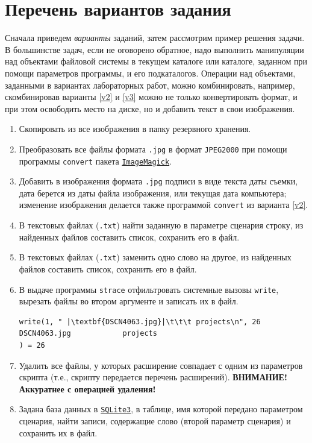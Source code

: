 \documentclass[a4paper,12pt,final,openany]{extbook}
\begin{document}
\section{Перечень вариантов задания}

Сначала приведем \emph{варианты} заданий, затем рассмотрим пример решения задачи. В большинстве задач, если не оговорено обратное, надо выполнить манипуляции над объектами файловой системы в текущем каталоге или каталоге, заданном при помощи параметров программы, и его подкаталогов. Операции над объектами, заданными в вариантах лабораторных работ, можно комбинировать, например, скомбинировав варианты \ref{v2} и \ref{v3} можно не только конвертировать формат, и при этом освободить место на диске, но и добавить текст в свои изображения.
\begin{enumerate}
\item Скопировать из все изображения в папку резервного хранения.
\item Преобразовать все файлы формата \texttt{.jpg} в формат \texttt{JPEG2000} при помощи программы \texttt{convert} пакета \href{https://imagemagick.org/index.php}{\texttt{ImageMagick}}. \label{v2}
\item \label{v3} Добавить в изображения формата \texttt{.jpg} подписи в виде текста даты съемки, дата берется из даты файла изображения, или текущая дата компьютера; изменение изображения делается также программой \texttt{convert} из варианта \ref{v2}.
\item В текстовых файлах (\texttt{.txt}) найти заданную в параметре сценария строку, из найденных файлов составить список, сохранить его в файл.
\item В текстовых файлах (\texttt{.txt}) заменить одно слово на другое, из найденных файлов составить список, сохранить его в файл.
\item В выдаче программы \texttt{strace} отфильтровать системные вызовы \texttt{write}, вырезать файлы во втором аргументе и записать их в файл.
\begin{verbatim}
write(1, " |\textbf{DSCN4063.jpg}|\t\t\t projects\n", 26 DSCN4063.jpg			 projects
) = 26
\end{verbatim}
\item Удалить все файлы, у которых расширение совпадает с одним из параметров скрипта (т.е., скрипту передается перечень расширений). \textbf{ВНИМАНИЕ! Аккуратнее с операцией удаления!}
\item Задана база данных в \href{https://www.sqlite.org/index.html}{\texttt{SQLite3}}, в таблице, имя которой передано параметром сценария, найти записи, содержащие слово (второй параметр сценария) и сохранить их в файл.
\end{enumerate}
\end{document}
